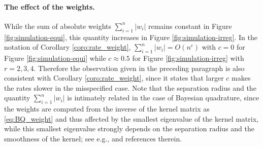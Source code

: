 \documentclass[11pt]{article}
\theoremstyle{remark}
\theoremstyle{example}
\theoremstyle{remark}
\begin{document}
\paragraph{The effect of the weights.}
While the sum of absolute weights $\sum_{i=1}^n |w_i|$ remains constant in Figure \ref{fig:simulation-equi}, this quantity increases in Figure \ref{fig:simulation-irreg}.
In the notation of Corollary \ref{coro:rate_weight}, $\sum_{i=1}^n |w_i| = O(n^c)$ with $c = 0$ for Figure \ref{fig:simulation-equi} while $c \approx 0.5$ for Figure \ref{fig:simulation-irreg} with $r = 2, 3, 4$.
Therefore the observation given in the preceding paragraph is also consistent with Corollary \ref{coro:rate_weight}, since it states that larger $c$ makes the rates slower in the misspecified case.
Note that the separation radius and the quantity $\sum_{i=1}^n |w_i|$ is intimately  related in the case of Bayesian quadrature, since the weights are computed from the inverse of the kernel matrix as \eqref{eq:BQ_weight} and thus affected by the smallest eigenvalue of the kernel matrix, while this smallest eigenvalue strongly depends on the separation radius and the smoothness of the kernel; see e.g., \cite{Sch95}  \cite[Section 12]{Wen05} and references therein.
\end{document}
